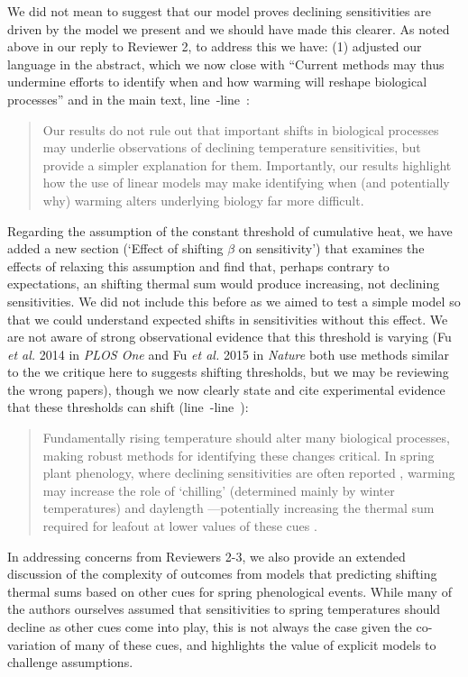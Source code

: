 \documentclass[11pt,letter]{article}
\newcommand{\lr}[1]{line~\lineref{#1}}
\begin{document}
We did not mean to suggest that our model proves declining sensitivities are driven by the model we present and we should have made this clearer. As noted above in our reply to Reviewer 2, to address this we have: (1) adjusted our language in the abstract, which we now close with ``Current methods may thus undermine efforts to identify when and how warming will reshape biological processes'' and in the main text, \lr{R2biomattersstart}-\lr{R2biomattersend}:
\begin{quote}
Our results do not rule out that important shifts in biological processes may underlie observations of declining temperature sensitivities, but provide a simpler explanation for them. Importantly, our results highlight how the use of linear models may make identifying when (and potentially why) warming alters underlying biology far more difficult.
\end{quote}
Regarding the assumption of the constant threshold of cumulative heat, we have added a new section (`Effect of shifting $\beta$ on sensitivity') that examines the effects of relaxing this assumption and find that, perhaps contrary to expectations, an shifting thermal sum would produce increasing, not declining sensitivities. We did not include this before as we aimed to test a simple model so that we could understand expected shifts in sensitivities without this effect. We are not aware of strong observational evidence that this threshold is varying (Fu \emph{et al.} 2014 in \emph{PLOS One} and Fu \emph{et al.} 2015 in \emph{Nature} both use methods similar to the we critique here to suggests shifting thresholds, but we may be reviewing the wrong papers), though we now clearly state and cite experimental evidence that these thresholds can shift (\lr{biomattersstart}-\lr{R4end}):
\begin{quote}
Fundamentally rising temperature should alter many biological processes, making robust methods for identifying these changes critical. In spring plant phenology, where declining sensitivities are often reported \citep{fu2015,piao2017,dai2019ag}, warming may increase the role of `chilling' (determined mainly by winter temperatures) and daylength \citep{Laube:2014a,zohner2016}---potentially increasing the thermal sum required for leafout at lower values of these cues \citep{Polgar2014,zohner2017,flynn2018}.
\end{quote} 
In addressing concerns from Reviewers 2-3, we also provide an extended discussion of the complexity of outcomes from models that predicting shifting thermal sums based on other cues for spring phenological events. While many of the authors ourselves assumed that sensitivities to spring temperatures should decline as other cues come into play, this is not always the case given the co-variation of many of these cues, and highlights the value of explicit models to challenge assumptions. \\
\end{document}
